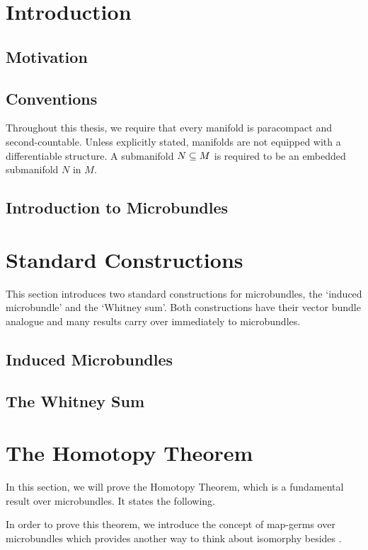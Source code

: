 \documentclass{article}
\begin{document}


\clearpage

\tableofcontents
\clearpage
\section{Introduction}\label{chapter::introduction}
\subsection*{Motivation}\label{section::motivation}

\subsection*{Conventions}
Throughout this thesis, we require that every manifold is paracompact and second-countable. Unless explicitly stated, manifolds are not equipped with a differentiable structure. A submanifold $N \subseteq{} M$ is required to be an embedded submanifold $N$ in $M$.
\subsection*{Introduction to Microbundles}\label{section::microbundle}

\section{Standard Constructions}\label{chapter::constructions}
\begin{myparagraph}
This section introduces two standard constructions for microbundles, the `induced microbundle' and the `Whitney sum'. Both constructions have their vector bundle analogue and many results carry over immediately to microbundles.
\end{myparagraph}
\subsection*{Induced Microbundles}\label{section::induced}

\subsection*{The Whitney Sum}\label{section::whitney}

\section{The Homotopy Theorem}\label{chapter::homotopy}
\begin{myparagraph}
In this section, we will prove the Homotopy Theorem, which is a fundamental result over microbundles. It states the following.
\end{myparagraph}

\begin{myparagraph}
In order to prove this theorem, we introduce the concept of map-germs over microbundles which provides another way to think about isomorphy besides .
\end{myparagraph}


\end{document}
